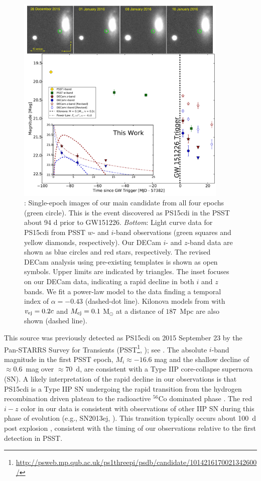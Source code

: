 \begin{figure}[t!]
\centering
\includegraphics[width=0.9\textwidth]{./figs/chapter4/fig2.pdf}
\caption{: Single-epoch images of our main candidate from all four epochs (green circle). This is the event discovered as PS15cdi in the PSST about 94 d prior to GW151226. {\it Bottom}: Light curve data for PS15cdi from PSST $w$- and $i$-band observations (green squares and yellow diamonds, respectively). Our DECam $i$- and $z$-band data are shown as blue circles and red stars, respectively. The revised DECam analysis  using pre-existing templates is shown as open symbols. Upper limits are indicated by triangles. The inset focuses on our DECam data, indicating a rapid decline in both $i$ and $z$ bands.  We fit a power-law model to the data finding a temporal index of  $\alpha = -0.43$ (dashed-dot line). Kilonova models from \citet{BarnesKasen13} with $v_{\rm ej}=0.2c$ and $M_{\rm ej}=0.1$ M$_\odot$  at a distance of $187$~Mpc are also shown (dashed line).}
\label{fig:ch4_PS15cdi}
\end{figure}

This source was previously detected as PS15cdi on 2015 September 23 by the Pan-STARRS  Survey for Transients (PSST\footnote{\singlespace \url{http://psweb.mp.qub.ac.uk/ps1threepi/psdb/candidate/1014216170021342600/}}, \citealt{Huber+15}); see . The absolute $i$-band  magnitude in the first PSST epoch, $M_i\approx -16.6$ mag and the shallow decline of $\approx0.6$~mag  over $\approx70$~d, are consistent with a Type IIP core-collapse supernova (SN).  A likely interpretation of the rapid decline in our observations is that PS15cdi is a Type IIP SN undergoing  the rapid transition from the hydrogen recombination driven plateau to the radioactive $^{56}$Co dominated  phase \citep{KasenWoosley09,Sanders+15,Dhungana+16}. The red $i-z$ color in our data is consistent with observations  of other IIP SN during this phase of evolution (e.g., SN2013ej, \citealt{Dhungana+16}). This transition typically occurs about 100~d post explosion \citep{KasenWoosley09,Sanders+15,Dhungana+16}, consistent with the  timing of our observations relative to the first detection in PSST.

